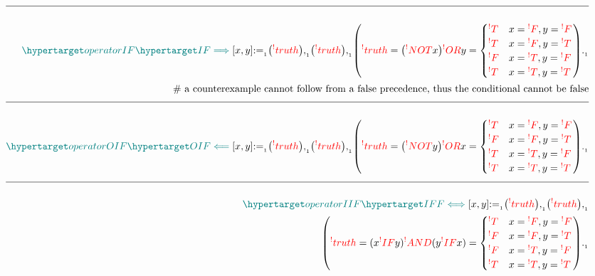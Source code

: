 \documentclass[a4paper]{article}
\makeatletter
\def\ml{\mleft}
\def\mr{\mright}
\newcommand{\defeq}{:=}
\newcommand{\eq}{=}
\newcommand{\cusand}{,}
\newcommand{\cusend}{.}
\newcommand{\cusnum}[2]{{#1}_{{\phantom{ }}_{#2}}}
\newcommand{\eqComment}[1]{\text{  \# #1}}
\newcommand{\n}{\\[1.5ex] \hline \nonumber \\[0ex]}
\newcommand{\m}{\nonumber \\}
\newcommand\rfrlist[1]{%
    \forcsvlist{\rfrlist@item}{#1}
}
\newcommand\rfrlist@item[1]{\rfr{#1}\\}
\newcommand{\thmlink}[2]{{}_{\substack{\rfrlist{#1}}}^{\dfn{#2}} }
\makeatother
\begin{document}
\begin{tcolorbox}
\begin{align}
    \n \dfn{operatorIF} [\dfn{IF}[\implies]][x, y] \cusnum{\defeq}{1} \ml(\rfr{truth} [x][]\mr) \cusnum{\cusand}{1} \ml(\rfr{truth} [y][]\mr) \cusnum{\cusand}{1} \ml(\rfr{truth} [x \rfr{IF} y][] \eq \ml(\rfr{NOT} x\mr) \rfr{OR} y \eq \begin{cases} \rfr{T} & x \eq \rfr{F} \cusand y \eq \rfr{F} \\ \rfr{T} & x \eq \rfr{F} \cusand y \eq \rfr{T} \\ \rfr{F} & x \eq \rfr{T} \cusand y \eq \rfr{F} \\ \rfr{T} & x \eq \rfr{T}\cusand y \eq \rfr{T} \end{cases}\mr) \cusnum{\cusend}{1}
\m \eqComment{a counterexample cannot follow from a false precedence, thus the conditional cannot be false}
    \n \dfn{operatorOIF} [\dfn{OIF}[\impliedby]][x, y] \cusnum{\defeq}{1} \ml(\rfr{truth} [x][]\mr) \cusnum{\cusand}{1} \ml(\rfr{truth} [y][]\mr) \cusnum{\cusand}{1} \ml(\rfr{truth} [x \rfr{OIF} y][] \eq \ml(\rfr{NOT} y\mr) \rfr{OR} x \eq \begin{cases} \rfr{T} & x \eq \rfr{F} \cusand y \eq \rfr{F} \\ \rfr{F} & x \eq \rfr{F} \cusand y \eq \rfr{T} \\ \rfr{T} & x \eq \rfr{T} \cusand y \eq \rfr{F} \\ \rfr{T} & x \eq \rfr{T} \cusand y \eq \rfr{T} \end{cases}\mr) \cusnum{\cusend}{1}
    \n \dfn{operatorIIF} [\dfn{IFF}[\iff]][x, y] \cusnum{\defeq}{1} \ml(\rfr{truth} [x][]\mr) \cusnum{\cusand}{1} \ml(\rfr{truth} [y][]\mr) \cusnum{\cusand}{1}
\m \ml(\rfr{truth} [x \rfr{IFF} y][] \eq (x \rfr{IF} y) \rfr{AND} (y \rfr{IF} x) \eq \begin{cases} \rfr{T} & x \eq \rfr{F} \cusand y \eq \rfr{F} \\ \rfr{F} & x \eq \rfr{F} \cusand y \eq \rfr{T} \\ \rfr{F} & x \eq \rfr{T} \cusand y \eq \rfr{F} \\ \rfr{T} & x \eq \rfr{T} \cusand y \eq \rfr{T} \end{cases}\mr) \cusnum{\cusend}{1}
\end{align}
\end{tcolorbox}
\end{document}
